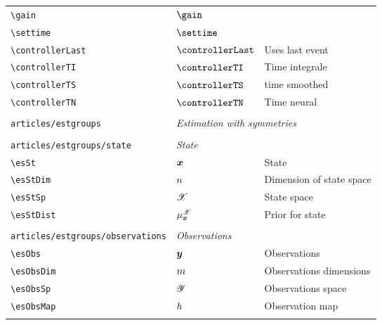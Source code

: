 \begin{longtable}{lll}
 {\color[rgb]{0.5,0.5,0.5}\texttt{\textbackslash gain}} & $\gain$ & \\ 
 {\color[rgb]{0.5,0.5,0.5}\texttt{\textbackslash settime}} & $\settime$ & \\ 
 {\color[rgb]{0.5,0.5,0.5}\texttt{\textbackslash controllerLast}} & $\controllerLast$ &  Uses last event\\ 
 {\color[rgb]{0.5,0.5,0.5}\texttt{\textbackslash controllerTI}} & $\controllerTI$ &  Time integrale\\ 
 {\color[rgb]{0.5,0.5,0.5}\texttt{\textbackslash controllerTS}} & $\controllerTS$ &  time smoothed\\ 
 {\color[rgb]{0.5,0.5,0.5}\texttt{\textbackslash controllerTN}} & $\controllerTN$ &  Time neural\\ 
  &  & \\ 
 {\color[rgb]{0.5,0.5,0.5}\texttt{articles/estgroups}} & \multicolumn{2}{l}{\emph{Estimation with symmetries}}\\ 
 \hline
 &  & \\ 
 {\color[rgb]{0.5,0.5,0.5}\texttt{articles/estgroups/state}} & \multicolumn{2}{l}{\emph{State}}\\ 
 \hline
{\color[rgb]{0.5,0.5,0.5}\texttt{\textbackslash esSt}} & $\boldsymbol{x}$ &  State\\ 
 {\color[rgb]{0.5,0.5,0.5}\texttt{\textbackslash esStDim}} & $n$ &  Dimension of state space\\ 
 {\color[rgb]{0.5,0.5,0.5}\texttt{\textbackslash esStSp}} & $\mathscr{X}$ &  State space\\ 
 {\color[rgb]{0.5,0.5,0.5}\texttt{\textbackslash esStDist}} & $\mu^{\mathscr{X}}_{\boldsymbol{x}}$ &  Prior for state\\ 
  &  & \\ 
 {\color[rgb]{0.5,0.5,0.5}\texttt{articles/estgroups/observations}} & \multicolumn{2}{l}{\emph{Observations}}\\ 
 \hline
{\color[rgb]{0.5,0.5,0.5}\texttt{\textbackslash esObs}} & $\boldsymbol{y}$ &  Observations\\ 
 {\color[rgb]{0.5,0.5,0.5}\texttt{\textbackslash esObsDim}} & $m$ &  Observations dimensions\\ 
 {\color[rgb]{0.5,0.5,0.5}\texttt{\textbackslash esObsSp}} & $\mathscr{Y}$ &  Observations space\\ 
 {\color[rgb]{0.5,0.5,0.5}\texttt{\textbackslash esObsMap}} & $h$ &  Observation map\\ 
  &  & {\setlength\fboxsep{1pt}%
\fbox{%
\color[rgb]{0.5,0.5,0.5}\begin{minipage}[]{8cm}%

\end{minipage}}}
\end{longtable}
